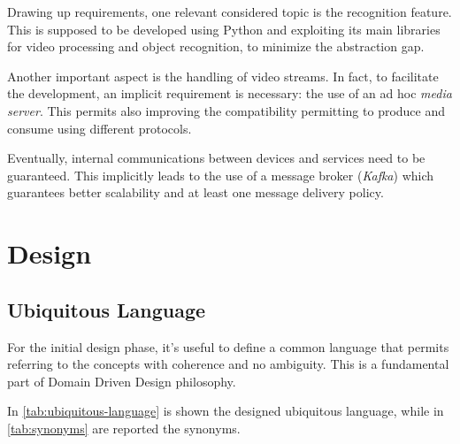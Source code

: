 \documentclass{scrartcl}
\begin{document}
    Drawing up requirements, one relevant considered topic is the recognition feature.
    This is supposed to be developed using Python and exploiting its main libraries for video processing and object recognition, to minimize the abstraction gap.

    Another important aspect is the handling of video streams.
    In fact, to facilitate the development, an implicit requirement is necessary: the use of an ad hoc \textit{media server}.
    This permits also improving the compatibility permitting to produce and consume using different protocols.

    Eventually, internal communications between devices and services need to be guaranteed.
    This implicitly leads to the use of a message broker (\textit{Kafka}) which guarantees better scalability and at least one message delivery policy.


    \section{Design}

    \subsection{Ubiquitous Language}

    For the initial design phase, it's useful to define a common language that permits referring to the concepts with coherence and no ambiguity.
    This is a fundamental part of Domain Driven Design philosophy.

    In \cref{tab:ubiquitous-language} is shown the designed ubiquitous language, while in \cref{tab:synonyms} are reported the synonyms.
\end{document}
